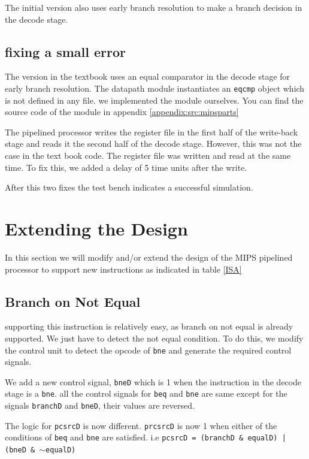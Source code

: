 \documentclass[titlepage,12pt,twoside,a4paper]{article}
\newcommand{\code}[1]{{\texttt{#1}}}
\begin{document}
The initial version also uses early branch resolution to make a branch decision in the decode stage.

\subsection{fixing a small error}

The version in the textbook uses an equal comparator in the decode stage for early branch resolution. The datapath module instantiates an \code{eqcmp} object which is not defined in any file. we implemented the module ourselves. You can find the source code of the module in appendix \ref{appendix:src:mipsparts}

The pipelined processor writes the register file in the first half of the write-back stage and reads it the second half of the decode stage. However, this was not the case in the text book code. The register file was written and read at the same time. To fix this, we added a delay of 5 time units after the write.

After this two fixes the test bench indicates a successful simulation.

\section{Extending the Design}

In this section we will modify and/or extend the design of the MIPS pipelined processor to support new instructions as indicated in table \ref{ISA}

\subsection{Branch on Not Equal}
supporting this instruction is relatively easy, as branch on not equal is already supported. We just have to detect the not equal condition. To do this, we modify the control unit to detect the opcode of \code{bne} and generate the required control signals.

We add a new control signal, \code{bneD} which is 1 when the instruction in the decode stage is a \code{bne}. all the control signals for \code{beq} and \code{bne} are same except for the signals \code{branchD} and \code{bneD}, their values are reversed. 

The logic for \code{pcsrcD} is now different. \code{prcsrcD} is now 1 when either of the conditions of \code{beq} and \code{bne} are satisfied. i.e \code{pcsrcD = (branchD \& equalD) | (bneD \& $\sim$equalD)}
\end{document}
